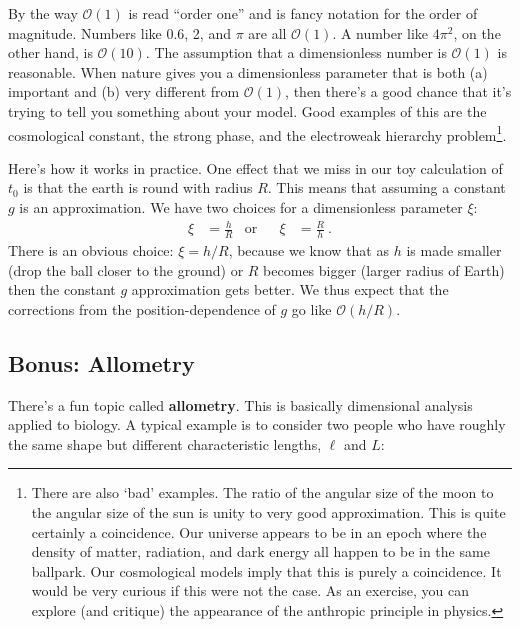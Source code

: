 By the way $\mathcal O(1)$ is read ``order one'' and is fancy notation for the order of magnitude. Numbers like 0.6, 2, and $\pi$ are all $\mathcal O(1)$. A number like $4\pi^2$, on the other hand, is $\mathcal O(10)$.  The assumption that a dimensionless number is $\mathcal O(1)$ is reasonable. When nature gives you a dimensionless parameter that is both (a) important and (b) very different from $\mathcal O(1)$, then there's a good chance that it's trying to tell you something about your model. Good examples of this are the cosmological constant, the strong  phase, and the electroweak hierarchy problem\footnote{There are also `bad' examples. The ratio of the angular size of the moon to the angular size of the sun is unity to very good approximation. This is quite certainly a coincidence. Our universe appears to be in an epoch where the density of matter, radiation, and dark energy all happen to be in the same ballpark. Our cosmological models imply that this is purely a coincidence. It would be very curious if this were not the case. As an exercise, you can explore (and critique) the appearance of the anthropic principle in physics.}. 

Here’s how it works in practice. One effect that we miss in our toy calculation of $t_0$ is that the earth is round with radius $R$. This means that assuming a constant $g$ is an approximation. We have two choices for a dimensionless parameter $\xi$:
\begin{align}
  \xi &= \frac{h}{R}
  &\text{or}&&
  \xi &= \frac{R}{h} \ .
\end{align}
There is an obvious choice: $\xi = h/R$, because we know that as $h$ is made smaller (drop the ball closer to the ground) or $R$ becomes bigger (larger radius of Earth) then the constant $g$ approximation gets better. We thus expect that the corrections from the position-dependence of $g$ go like $\mathcal O(h/R)$.
 


\subsection{Bonus: Allometry}

There’s a fun topic called \textbf{allometry}. This is basically dimensional analysis applied to biology. A typical example is to consider two people who have roughly the same shape but different characteristic lengths, $\ell$ and $L$:

